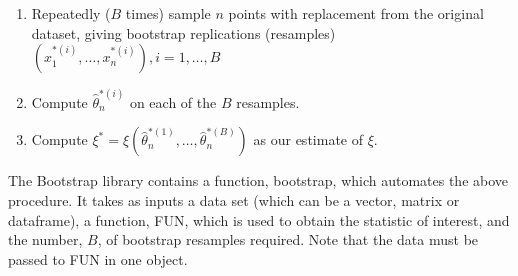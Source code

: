 \documentclass{article}\usepackage[]{graphicx}\usepackage[]{color}
\begin{document}
\begin{enumerate}
\item Repeatedly ($B$ times) sample $n$ points with replacement from the original
dataset, giving bootstrap replications (resamples) $(x_1^{*(i)},\ldots,x_n^{*(i)}), i=1,\ldots,B$
\item Compute $\hat\theta_n^{*(i)}$ on each of the $B$ resamples.
\item Compute $\xi^*=\xi(\hat\theta_n^{*(1)},\ldots,\hat\theta_n^{*(B)})$ as our estimate of $\xi$.
\end{enumerate}

The Bootstrap library contains a function, bootstrap, which automates the above procedure. It takes as inputs a data set (which can be a vector, matrix or dataframe), a function, FUN, which is used to obtain the statistic of interest, and the number, $B$, of bootstrap resamples required. Note that the data must be passed to FUN in one object.
\end{document}
